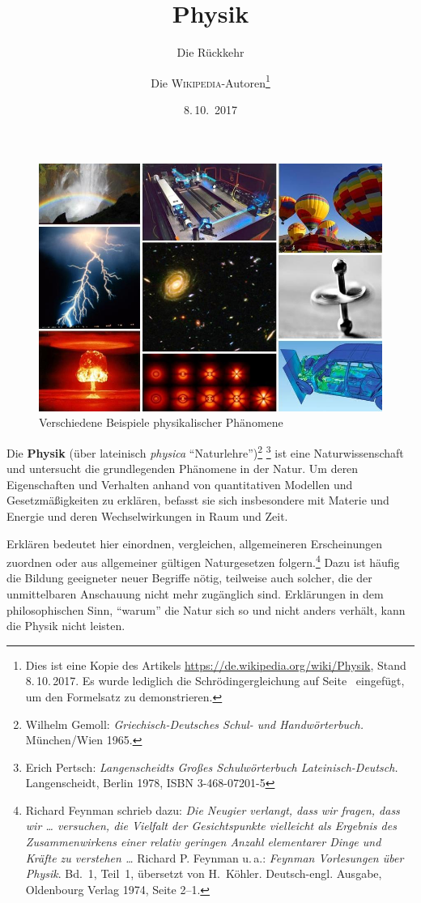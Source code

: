 \documentclass[titlepage, parkskip=full, twocolumn, landscape]{scrartcl}
\title{Physik}
\author{Die \textsc{Wikipedia}-Autoren\thanks{Dies ist eine Kopie des Artikels \url{https://de.wikipedia.org/wiki/Physik}, Stand 8.\,10.\,2017. Es wurde lediglich die Schrödingergleichung auf Seite~\pageref{eq:schrödinger} eingefügt, um den Formelsatz zu demonstrieren.}}
\date{8.\,10.~2017}
\subtitle{Die Rückkehr}
\begin{document}
\maketitle

\tableofcontents

\begin{figure}
	\centering
	\includegraphics[width=12cm]{images/1.jpg}
	\caption{Verschiedene Beispiele physikalischer Phänomene}
\end{figure}

\noindent Die \textbf{Physik} (über lateinisch \emph{physica} "`Naturlehre"')\footnote{Wilhelm Gemoll: \emph{Griechisch-Deutsches Schul- und Handwörterbuch.} München/Wien 1965.} \footnote{Erich Pertsch: \emph{Langenscheidts Großes Schulwörterbuch Lateinisch-Deutsch.} Langenscheidt, Berlin 1978, ISBN 3-468-07201-5} ist eine Naturwissenschaft und untersucht die grundlegenden Phänomene in der Natur. Um deren Eigenschaften und Verhalten anhand von quantitativen Modellen und Gesetzmäßigkeiten zu erklären, befasst sie sich insbesondere mit Materie und Energie und deren Wechselwirkungen in Raum und Zeit.

Erklären bedeutet hier einordnen, vergleichen, allgemeineren Erscheinungen zuordnen oder aus allgemeiner gültigen Naturgesetzen folgern.\footnote{Richard Feynman schrieb dazu: \emph{Die Neugier verlangt, dass wir fragen, dass wir \dots{} versuchen, die Vielfalt der Gesichtspunkte vielleicht als Ergebnis des Zusammenwirkens einer relativ geringen Anzahl elementarer Dinge und Kräfte zu verstehen \dots} Richard P. Feynman u.\,a.: \emph{Feynman Vorlesungen über Physik}. Bd.~1, Teil~1, übersetzt von H.~Köhler. Deutsch-engl. Ausgabe, Oldenbourg Verlag 1974, Seite 2--1.} Dazu ist häufig die Bildung geeigneter neuer Begriffe nötig, teilweise auch solcher, die der unmittelbaren Anschauung nicht mehr zugänglich sind. Erklärungen in dem philosophischen Sinn, "`warum"' die Natur sich so und nicht anders verhält, kann die Physik nicht leisten.
\end{document}

